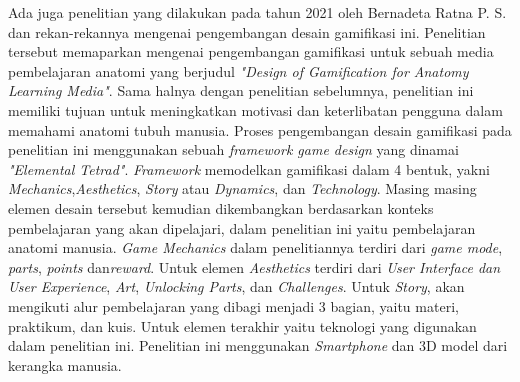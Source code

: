 Ada juga penelitian yang dilakukan pada tahun 2021 oleh Bernadeta Ratna P. S. dan rekan-rekannya mengenai pengembangan desain gamifikasi ini.
Penelitian tersebut memaparkan mengenai pengembangan gamifikasi untuk sebuah media pembelajaran anatomi yang berjudul \textit{"Design of Gamification for Anatomy Learning Media"}.
Sama halnya dengan penelitian sebelumnya, penelitian ini memiliki tujuan untuk meningkatkan motivasi dan keterlibatan pengguna dalam memahami anatomi tubuh manusia.
Proses pengembangan desain gamifikasi pada penelitian ini menggunakan sebuah \textit{framework game design} yang dinamai \textit{"Elemental Tetrad"}.
\textit{Framework} memodelkan gamifikasi dalam 4 bentuk, yakni \textit{Mechanics},\textit{Aesthetics}, \textit{Story} atau \textit{Dynamics}, dan \textit{Technology}.
Masing masing elemen desain tersebut kemudian dikembangkan berdasarkan konteks pembelajaran yang akan dipelajari, dalam penelitian ini yaitu pembelajaran anatomi manusia.
\textit{Game Mechanics} dalam penelitiannya terdiri dari \textit{game mode}, \textit{parts}, \textit{points} dan\textit{reward}. 
Untuk elemen \textit{Aesthetics} terdiri dari \textit{ User Interface dan User Experience}, \textit{Art}, \textit{Unlocking Parts}, dan \textit{Challenges}.
Untuk \textit{Story}, akan mengikuti alur pembelajaran yang dibagi menjadi 3 bagian, yaitu materi, praktikum, dan kuis.
Untuk elemen terakhir yaitu teknologi yang digunakan dalam penelitian ini. Penelitian ini menggunakan \textit{Smartphone} dan 3D model dari kerangka manusia.
